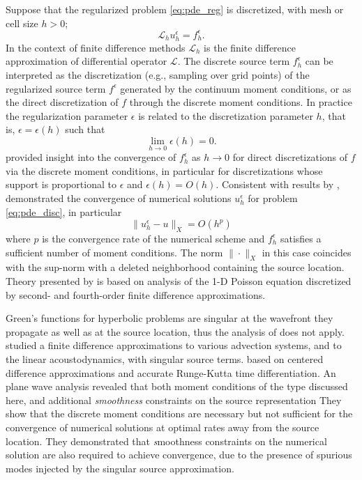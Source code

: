 Suppose that the regularized problem \ref{eq:pde_reg} is discretized, with mesh or cell size $h>0$;
\begin{equation}\label{eq:pde_disc}
	\mathcal L_h u^{\epsilon}_h = f^{\epsilon}_h.
\end{equation}
In the context of finite difference methods $\mathcal L_h$ is the finite difference approximation of differential operator $\mathcal L$.
The discrete source term $f^\epsilon_h$ can be interpreted as the discretization 
(e.g., sampling over grid points) of the regularized source term $f^\epsilon$  generated by the continuum moment conditions, or as the direct discretization of $f$ through the discrete moment conditions.
In practice the regularization parameter $\epsilon$ is related to the discretization parameter $h$, that is, $\epsilon = \epsilon(h)$ such that
\[
	\lim_{h\to 0} \epsilon(h) = 0.
\]
\cite{TorEng:04} provided insight into the convergence of $f^\epsilon_h$ as $h\to 0$ for direct discretizations of $f$ via the discrete moment conditions, in particular for discretizations whose support is proportional to $\epsilon$ and $\epsilon(h) = O(h)$.
Consistent with results by \cite{Walden:1999}, \cite{TorEng:04} demonstrated the convergence of numerical solutions $u^\epsilon_h$ for problem \ref{eq:pde_disc}, in particular
\[
	\| u^\epsilon_h - u\|_X = O(h^p)
\]
where $p$ is the convergence rate of the numerical scheme and $f^{\epsilon}_h$ satisfies a sufficient number of moment conditions. 
The norm $\|\cdot\|_X$ in this case coincides with the sup-norm with a deleted neighborhood containing the source location.
Theory presented by \cite{TorEng:04} is based on analysis of the 1-D Poisson equation discretized by second- and fourth-order finite difference approximations.%

Green's functions for hyperbolic problems are singular at the wavefront they propagate as well as at the source location, thus the analysis of \cite{TorEng:04} does not apply.
\cite{Petersson:2016} studied a finite difference approximations to various
advection systems, and to the linear acoustodynamics, with singular
source terms. based on centered difference approximations and accurate
Runge-Kutta time differentiation. An plane wave analysis revealed that
both moment conditions of the type discussed here, and additional {\em smoothness}
constraints on the source representation
They show that the discrete moment conditions are necessary but not sufficient for the convergence of numerical solutions at optimal rates away from the source location.
They demonstrated that {\emph smoothness constraints} on the numerical
solution are also required to achieve convergence, due to the presence
of spurious modes injected by the singular source approximation. 

